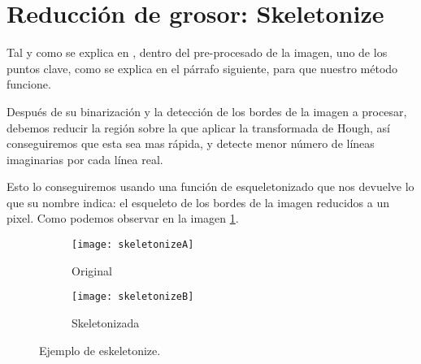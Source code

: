 \section{Reducción de grosor: Skeletonize}
Tal y como se explica en \cite{scik:skeleton}, dentro del pre-procesado de la imagen, uno de los puntos clave, como se explica en el párrafo siguiente, para que nuestro método funcione.

Después de su binarización y la detección de los bordes de la imagen a procesar, debemos reducir la región sobre la que aplicar la transformada de Hough, así conseguiremos que esta sea mas rápida, y detecte menor número de líneas imaginarias por cada línea real.

Esto lo conseguiremos usando una función de esqueletonizado que nos devuelve lo que su nombre indica: el esqueleto de los bordes de la imagen reducidos a un pixel. Como podemos observar en la imagen \ref{fig:3.6}.


\begin{figure}
\begin{subfigure}[b]{.5\linewidth}
\centering\large \texttt{[image: skeletonizeA]}
\caption{Original}
\end{subfigure}%
\begin{subfigure}[b]{.5\linewidth}
\centering\large \texttt{[image: skeletonizeB]}
\caption{Skeletonizada}
\end{subfigure}
\caption{Ejemplo de eskeletonize.}\label{fig:3.6}
\end{figure}


